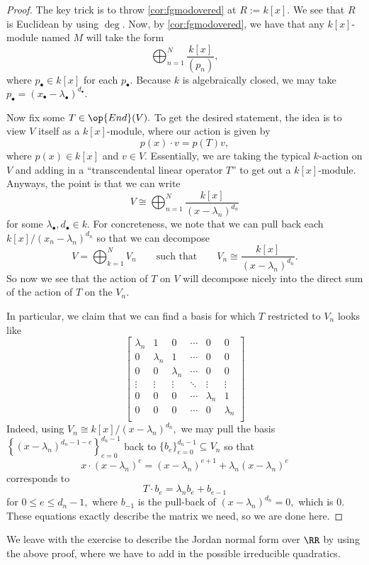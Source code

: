 \begin{proof}
	The key trick is to throw \autoref{cor:fgmodovered} at $R:=k[x].$ We see that $R$ is Euclidean by using $\deg.$ Now, by \autoref{cor:fgmodovered}, we have that any $k[x]$-module named $M$ will take the form
	\[\bigoplus_{n=1}^N\frac{k[x]}{(p_n)},\]
	where $p_\bullet\in k[x]$ for each $p_\bullet.$ Because $k$ is algebraically closed, we may take $p_\bullet=(x_\bullet-\lambda_\bullet)^{d_\bullet}.$

	Now fix some $T\in\op{End}(V).$ To get the desired statement, the idea is to view $V$ itself as a $k[x]$-module, where our action is given by
	\[p(x)\cdot v=p(T)v,\]
	where $p(x)\in k[x]$ and $v\in V.$ Essentially, we are taking the typical $k$-action on $V$ and adding in a ``transcendental linear operator $T$'' to get out a $k[x]$-module. Anyways, the point is that we can write
	\[V\cong\bigoplus_{n=1}^N\frac{k[x]}{(x-\lambda_n)^{d_n}}\]
	for some $\lambda_\bullet,d_\bullet\in k.$ For concreteness, we note that we can pull back each $k[x]/(x_n-\lambda_n)^{d_n}$ so that we can decompose
	\[V=\bigoplus_{k=1}^NV_n\qquad\text{such that}\qquad V_n\cong\frac{k[x]}{(x-\lambda_n)^{d_n}}.\]
	So now we see that the action of $T$ on $V$ will decompose nicely into the direct sum of the action of $T$ on the $V_n.$

	In particular, we claim that we can find a basis for which $T$ restricted to $V_n$ looks like
	\[\begin{bmatrix}
		\lambda_n & 1 & 0 & \cdots & 0 & 0 \\
		0 & \lambda_n & 1 & \cdots & 0 & 0 \\
		0 & 0 & \lambda_n & \cdots & 0 & 0 \\
		\vdots & \vdots & \vdots & \ddots & \vdots & \vdots \\
		0 & 0 & 0 & \cdots & \lambda_n & 1 \\
		0 & 0 & 0 & \cdots & 0 & \lambda_n \\
	\end{bmatrix}\]
	Indeed, using $V_n\cong k[x]/(x-\lambda_n)^{d_n},$ we may pull the basis $\left\{(x-\lambda_n)^{d_n-1-e}\right\}_{e=0}^{d_n-1}$ back to $\{b_e\}_{e=0}^{d_n-1}\subseteq V_n$ so that
	\[x\cdot(x-\lambda_n)^e=(x-\lambda_n)^{e+1}+\lambda_n(x-\lambda_n)^e\]
	corresponds to
	\[T\cdot b_e=\lambda_nb_e+b_{e-1}\]
	for $0\le e\le d_n-1,$ where $b_{-1}$ is the pull-back of $(x-\lambda_n)^{d_n}=0,$ which is $0.$ These equations exactly describe the matrix we need, so we are done here.
\end{proof}
We leave with the exercise to describe the Jordan normal form over $\RR$ by using the above proof, where we have to add in the possible irreducible quadratics.